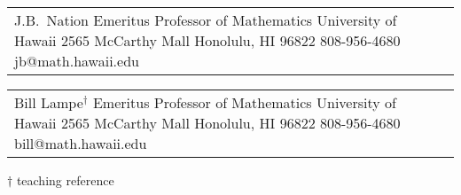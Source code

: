     \begin{tabular}{@{}p{6cm}p{6cm}}
          {J.B.~Nation}
          {Emeritus Professor of Mathematics}
          {University of Hawaii}
          {2565 McCarthy Mall}
          {Honolulu, HI 96822}
          {808-956-4680}
          {jb@math.hawaii.edu}
    \end{tabular}
    \begin{tabular}{@{}p{6cm}p{6cm}}
          {Bill Lampe$^\dag$}
          {Emeritus Professor of Mathematics}
          {University of Hawaii}
          {2565 McCarthy Mall}
          {Honolulu, HI 96822}
          {808-956-4680}
          {bill@math.hawaii.edu}
    \end{tabular}

    \vskip5mm

    $\dag$ teaching reference


